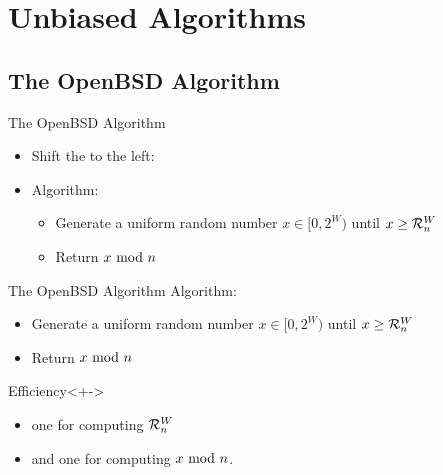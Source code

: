 \section{Unbiased Algorithms}

\subsection{The OpenBSD Algorithm}\label{sec:2.1}
\begin{frame}{The OpenBSD Algorithm}
    \pause 
    \begin{itemize}[<+->]
        \item Shift the  to the left:
        \item Algorithm: \begin{itemize}[<+->]
            \item Generate a uniform random number $x \in [0,2^W)$ until $x \geq \mathcal{R}_n^W$
            \item Return $x \ \mathrm{mod}\ n$
        \end{itemize} 
    \end{itemize}

\end{frame}

\begin{frame}{The OpenBSD Algorithm}
    Algorithm: \begin{itemize}
        \item Generate a uniform random number $x \in [0,2^W)$ until $x \geq \mathcal{R}_n^W$
        \item Return $x \ \mathrm{mod}\ n$
    \end{itemize} 
    \pause 
    \vspace*{0.5cm}
    \begin{block}{Efficiency}<+->
         \begin{itemize}[<+->]
            \item one for computing $\mathcal{R}_n^W$
            \item and one for computing $x \ \mathrm{mod}\ n$.
        \end{itemize}
    \end{block}
\end{frame}




